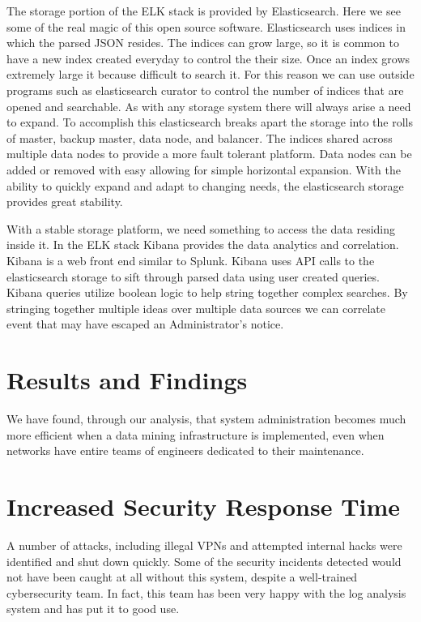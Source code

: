 \documentclass{acm_proc_article-sp}
\begin{document}
The storage portion of the ELK stack is provided by Elasticsearch.  Here we see some of the real magic of this open source software.  Elasticsearch uses indices in which the parsed JSON resides.  The indices can grow large, so it is common to have a new index created everyday to control the their size.  Once an index grows extremely large it because difficult to search it.  For this reason we can use outside programs such as elasticsearch curator to control the number of indices that are opened and searchable. As with any storage system there will always arise a need to expand.  To accomplish this elasticsearch breaks apart the storage into the rolls of master, backup master, data node, and balancer.  The indices shared across multiple data nodes to provide a more fault tolerant platform.  Data nodes can be added or removed with easy allowing for simple horizontal expansion.  With the ability to quickly expand and adapt to changing needs, the elasticsearch storage provides great stability.

With a stable storage platform, we need something to access the data residing inside it.  In the ELK stack Kibana provides the data analytics and correlation.  Kibana is a web front end similar to Splunk.  Kibana uses API calls to the elasticsearch storage to sift through parsed data using user created queries. Kibana queries utilize boolean logic to help string together complex searches.  By stringing together multiple ideas over multiple data sources we can correlate event that may have escaped an Administrator's notice.         

\section{Results and Findings}
We have found, through our analysis, that system administration becomes much more efficient when a data mining infrastructure is implemented, even when networks have entire teams of engineers dedicated to their maintenance.

\section{Increased Security Response Time}
A number of attacks, including illegal VPNs and attempted internal hacks were identified and shut down quickly.  Some of the security incidents detected would not have been caught at all without this system, despite a well-trained cybersecurity team.  In fact, this team has been very happy with the log analysis system and has put it to good use.
\end{document}
